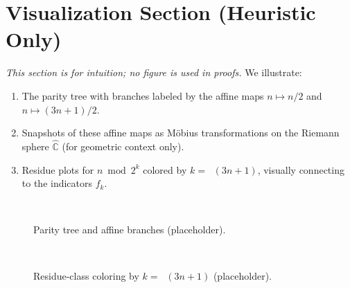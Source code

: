 \documentclass[11pt]{article}
\theoremstyle{plain}
\theoremstyle{definition}
\theoremstyle{remark}
\DeclareMathOperator{\vtwo}{v_2}
\newcommand{\1}{\mathbf{1}}
\begin{document}
\section{Visualization Section (Heuristic Only)}
\emph{This section is for intuition; no figure is used in proofs.} We illustrate:
\begin{enumerate}[label=\textbf{V\arabic*}.,leftmargin=*]
  \item The parity tree with branches labeled by the affine maps $n\mapsto n/2$ and $n\mapsto (3n+1)/2$.
  \item Snapshots of these affine maps as Möbius transformations on the Riemann sphere $\hat{\mathbb C}$ (for geometric context only).
  \item Residue plots for $n\bmod 2^k$ colored by $k=\vtwo(3n+1)$, visually connecting to the indicators $f_k$.
\end{enumerate}
\begin{figure}[h]
  \centering
  \fbox{\rule{0pt}{1.75in}\rule{0.95\linewidth}{0pt}}\\[-2pt]
  \caption{Parity tree and affine branches (placeholder).}
\end{figure}
\begin{figure}[h]
  \centering
  \fbox{\rule{0pt}{1.75in}\rule{0.95\linewidth}{0pt}}\\[-2pt]
  \caption{Residue-class coloring by $k=\vtwo(3n+1)$ (placeholder).}
\end{figure}
\end{document}
